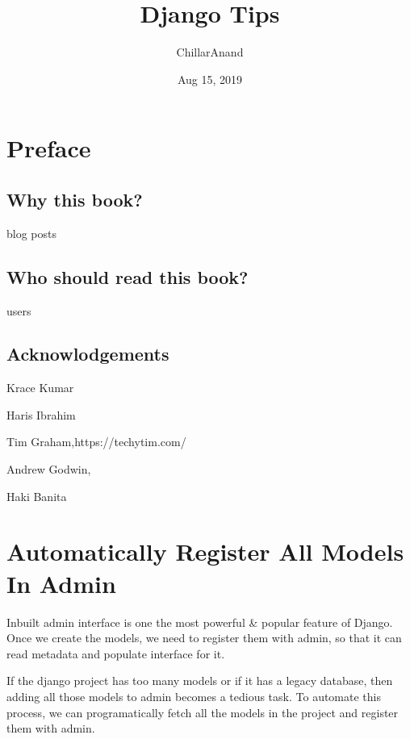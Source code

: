 \documentclass[letterpaper,11pt,english]{sphinxmanual}
\title{Django Tips}
\date{Aug 15, 2019}
\author{ChillarAnand}
\begin{document}
\pagestyle{empty}
\sphinxmaketitle
\pagestyle{plain}
\sphinxtableofcontents
\pagestyle{normal}
\label{\detokenize{index::doc}}



\chapter{Preface}
\label{\detokenize{preface:preface}}\label{\detokenize{preface::doc}}

\section{Why this book?}
\label{\detokenize{preface:why-this-book}}
blog posts


\section{Who should read this book?}
\label{\detokenize{preface:who-should-read-this-book}}
users


\section{Acknowlodgements}
\label{\detokenize{preface:acknowlodgements}}
Krace Kumar

Haris Ibrahim

Tim Graham,https://techytim.com/

Andrew Godwin, 

Haki Banita



\chapter{Automatically Register All Models In Admin}
\label{\detokenize{admin_auto_register_models:automatically-register-all-models-in-admin}}\label{\detokenize{admin_auto_register_models::doc}}
Inbuilt admin interface is one the most powerful \& popular feature of Django. Once we create the models, we need to register them with admin, so that it can read metadata and populate interface for it.

If the django project has too many models or if it has a legacy database, then adding all those models to admin becomes a tedious task. To automate this process, we can programatically fetch all the models in the project and register them with admin.
\end{document}
